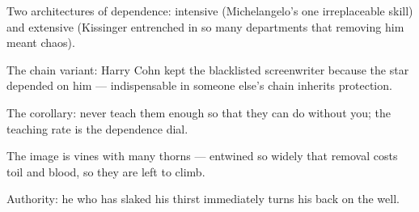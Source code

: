 

\begin{distilled}
  \item Two architectures of dependence: intensive (Michelangelo's one irreplaceable skill) and extensive (Kissinger entrenched in so many departments that removing him meant chaos).
  \item The chain variant: Harry Cohn kept the blacklisted screenwriter because the star depended on him --- indispensable in someone else's chain inherits protection.
  \item The corollary: never teach them enough so that they can do without you; the teaching rate is the dependence dial.
  \item The image is vines with many thorns --- entwined so widely that removal costs toil and blood, so they are left to climb.
  \item Authority: he who has slaked his thirst immediately turns his back on the well.
\end{distilled}

